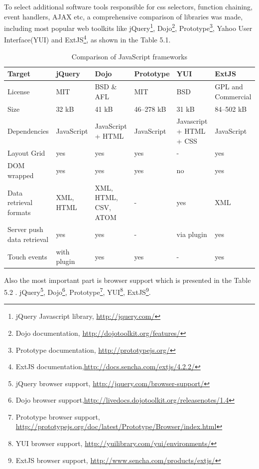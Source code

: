 	To select additional software tools responsible for css selectors, function chaining, event handlers, AJAX etc, a comprehensive comparison of libraries was made, including most popular web toolkits like jQuery\footnote{jQuery Javascript library, \url{http://jquery.com/}}, Dojo\footnote{Dojo documentation, \url{http://dojotoolkit.org/features/}}, Prototype\footnote{Prototype documentation, \url{http://prototypejs.org/}}, Yahoo User Interface(YUI) and ExtJS\footnote{ExtJS documentation,\url{http://docs.sencha.com/extjs/4.2.2/}}, as shown in the Table 5.1. 
	\begin{table}[H]
	\centering
	\begin{tabular}{|L{3cm}|l|L{2cm}|l|L{2cm}|L{2cm}|}
	\hline
	Target 			& jQuery & Dojo & Prototype & YUI & ExtJS \\
	\hline
	\hline
	License		& MIT & BSD \& AFL & MIT & BSD & GPL and Commercial \\
	\hline
	Size		& 32 kB & 41 kB & 46–278 kB & 31 kB & 84–502 kB \\
	\hline
	Dependencies		& JavaScript & JavaScript + HTML & JavaScript &  Javascript + HTML + CSS & JavaScript \\
	\hline
	Layout Grid		& yes & yes & yes & - & yes  \\
	\hline
	DOM wrapped		& yes & yes & yes & no & yes \\
	\hline
	Data retrieval formats		& XML, HTML & XML, HTML, CSV, ATOM & - & yes & XML  \\
	\hline
	Server push data retrieval		& yes & yes & - & via plugin & yes \\
	\hline 		
	Touch events		& with plugin & yes & yes & - & yes \\
	\hline 
	\end{tabular}
	\caption[Comparison of JavaScript frameworks]{Comparison of JavaScript frameworks}
	\label{tab:JS_frameworks}
	\end{table}
	Also the most important part is browser support which is presented in the Table 5.2 . jQuery\footnote{jQuery browser support, \url{http://jquery.com/browser-support/}}, Dojo\footnote{Dojo browser support,\url{http://livedocs.dojotoolkit.org/releasenotes/1.4}}, Prototype\footnote{Prototype browser support, \url{http://prototypejs.org/doc/latest/Prototype/Browser/index.html}}, YUI\footnote{YUI browser support, \url{http://yuilibrary.com/yui/environments/}}, ExtJS\footnote{ExtJS browser support, \url{http://www.sencha.com/products/extjs/}}.

